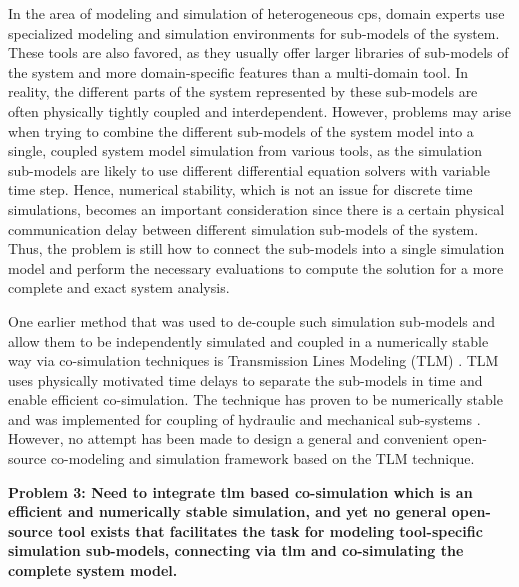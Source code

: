 In the area of modeling and simulation of heterogeneous \acrshort{cps}, domain experts use specialized modeling and simulation environments for sub-models of the system. These tools are also favored, as they usually offer larger libraries of sub-models of the system and more domain-specific features than a multi-domain tool. In reality, the different parts of the system represented by these sub-models are often physically tightly coupled and interdependent. However, problems may arise when trying to combine the different sub-models of the system model into a single, coupled system model simulation from various tools, as the simulation sub-models are likely to use different differential equation solvers with variable time step. Hence, numerical stability, which is not an issue for discrete time simulations, becomes an important consideration since there is a certain physical communication delay between different simulation sub-models of the system. Thus, the problem is still how to connect the sub-models into a single simulation model and perform the necessary evaluations to compute the solution for a more complete and exact system analysis. 

One earlier method that was used to de-couple such simulation sub-models and allow them to be independently simulated and coupled in a numerically stable way via co-simulation techniques is Transmission Lines Modeling (TLM) \cite{tlmkurs90,tlmkurs99,tlmcogan,tlmjohns}. TLM uses physically motivated time delays to separate the sub-models in time and enable efficient co-simulation. The technique has proven to be numerically stable and was implemented for coupling of hydraulic and mechanical sub-systems \cite{tlmkurs90,tlmkurs99}. However, no attempt has been made to design a general and convenient open-source co-modeling and simulation framework based on the TLM technique. 

\begin{description}

\item \textbf{Problem 3: Need to integrate \acrshort{tlm} based co-simulation which is an efficient and numerically stable simulation, and yet no general open-source tool exists that facilitates the task for modeling tool-specific simulation sub-models, connecting via \acrshort{tlm} and co-simulating the complete system model.}

\end{description}

